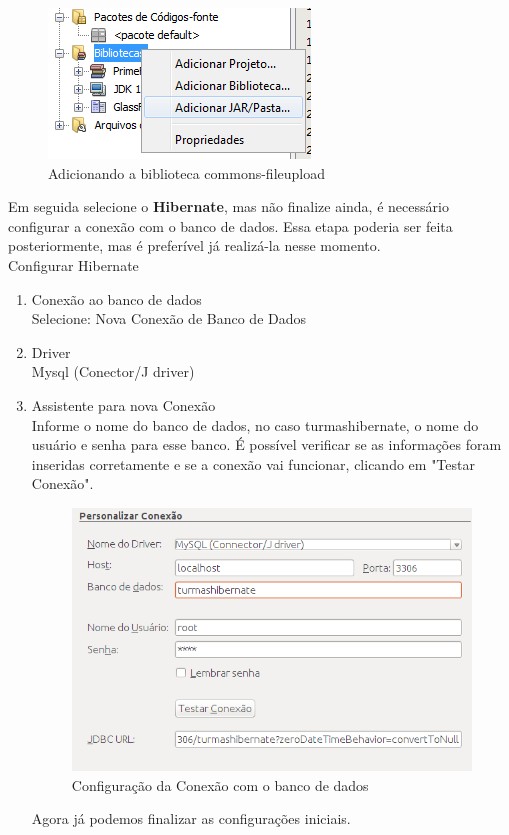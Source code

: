 \documentclass[12pt,a4paper]{article}
\begin{document}
\begin{figure}[H]
    \centering
    \includegraphics[scale=0.70]{adicionarJar}
    \caption{Adicionando a biblioteca commons-fileupload}
    \label{imagemAdicionarJar}
\end{figure}


Em seguida selecione o \textbf{Hibernate}, mas não finalize ainda, é necessário configurar a conexão com o banco de dados. Essa etapa poderia ser feita posteriormente, mas é preferível já realizá-la nesse momento.\\

Configurar Hibernate
\begin{enumerate}
\item{Conexão ao banco de dados}\\
Selecione: Nova Conexão de Banco de Dados
\item{Driver}\\
Mysql (Conector/J driver)
\item{Assistente para nova Conexão}\\
Informe o nome do banco de dados, no caso turmashibernate, o nome do usuário e senha para esse banco. É possível verificar se as informações foram inseridas corretamente e se a conexão vai funcionar, clicando em "Testar Conexão".
\begin{figure}[H]
    \centering
    \includegraphics[scale=0.50]{ConfiguracaoConexao.png}
    \caption{Configuração da Conexão com o banco de dados}
    \label{imagemConfiguracaoConexao}
\end{figure}

   Agora já podemos finalizar as configurações iniciais.
\end{enumerate}
\end{document}
